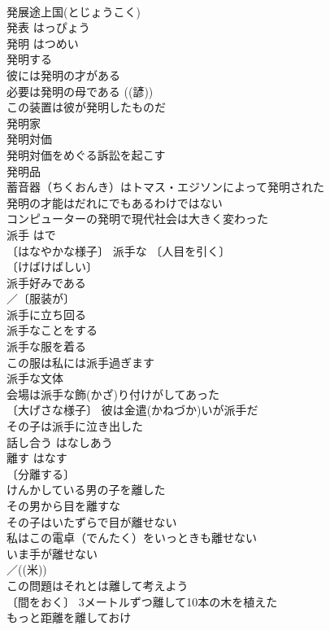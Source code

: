 \documentclass[8pt]{extreport}
\begin{document}
\begin{CJK}{UTF8}{min}
\\	発展途上国(とじょうこく) 
\\	発表	はっぴょう	
\\	発明	はつめい	
\\	発明する 
\\	彼には発明の才がある 
\\	必要は発明の母である ((諺)) 
\\	この装置は彼が発明したものだ 
\\	発明家 
\\	発明対価 
\\	発明対価をめぐる訴訟を起こす 
\\	発明品 
\\	蓄音器（ちくおんき）はトマス・エジソンによって発明された 
\\	発明の才能はだれにでもあるわけではない 
\\	コンピューターの発明で現代社会は大きく変わった 
\\	派手	はで	
\\	〔はなやかな様子〕 派手な 〔人目を引く〕
\\	〔けばけばしい〕
\\	派手好みである 
\\	／〔服装が〕
\\	派手に立ち回る 
\\	派手なことをする 
\\	派手な服を着る 
\\	この服は私には派手過ぎます 
\\	派手な文体 
\\	会場は派手な飾(かざ)り付けがしてあった 
\\	〔大げさな様子〕 彼は金遣(かねづか)いが派手だ 
\\	その子は派手に泣き出した 
\\	話し合う	はなしあう	
\\	離す	はなす	
\\	〔分離する〕
\\	けんかしている男の子を離した 
\\	その男から目を離すな 
\\	その子はいたずらで目が離せない 
\\	私はこの電卓（でんたく）をいっときも離せない 
\\	いま手が離せない 
\\	／((米)) 
\\	この問題はそれとは離して考えよう 
\\	〔間をおく〕 3メートルずつ離して10本の木を植えた 
\\	もっと距離を離しておけ 

\end{CJK}
\end{document}
